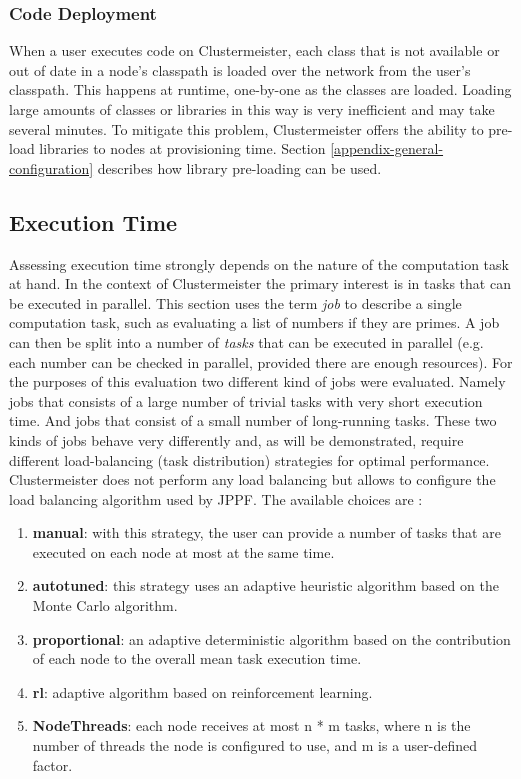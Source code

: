 \documentclass[english]{uzhpub}
\begin{document}
\subsubsection{Code Deployment}
\label{code-deployment}
When a user executes code on Clustermeister, each class that is not available or out of date in a node's classpath is loaded over the network from the user's classpath. This happens at runtime, one-by-one as the classes are loaded. Loading large amounts of classes or libraries in this way is very inefficient and may take several minutes. To mitigate this problem, Clustermeister offers the ability to pre-load libraries to nodes at provisioning time. Section \ref{appendix-general-configuration} describes how library pre-loading can be used.

\subsection{Execution Time}

Assessing execution time strongly depends on the nature of the computation task at hand. In the context of Clustermeister the primary interest is in tasks that can be executed in parallel. This section uses the term \textit{job} to describe a single computation task, such as evaluating a list of numbers if they are primes. A job can then be split into a number of \textit{tasks} that can be executed in parallel (e.g. each number can be checked in parallel, provided there are enough resources). For the purposes of this evaluation two different kind of jobs were evaluated. Namely jobs that consists of a large number of trivial tasks with very short execution time. And jobs that consist of a small number of long-running tasks. These two kinds of jobs behave very differently and, as will be demonstrated, require different load-balancing (task distribution) strategies for optimal performance. Clustermeister does not perform any load balancing but allows to configure the load balancing algorithm used by JPPF. The 
available choices are \cite{jppf-lb}:

\begin{enumerate}
 \item \textbf{manual}: with this strategy, the user can provide a number of tasks that are executed on each node at most at the same time.
 \item \textbf{autotuned}: this strategy uses an adaptive heuristic algorithm based on the Monte Carlo algorithm.
 \item \textbf{proportional}: an adaptive deterministic algorithm based on the contribution of each node to the overall mean task execution time.
 \item \textbf{rl}: adaptive algorithm based on reinforcement learning.
 \item \textbf{NodeThreads}: each node receives at most n * m tasks, where n is the number of threads the node is configured to use, and m is a user-defined factor. 
\end{enumerate}
\end{document}
